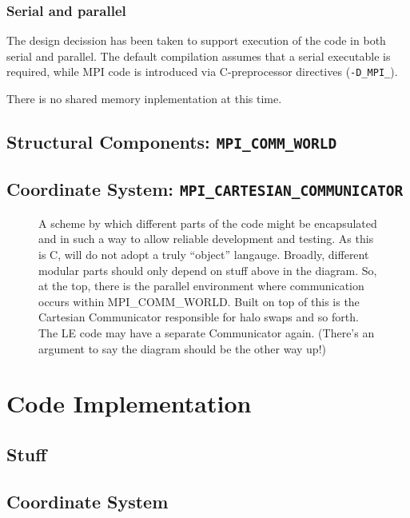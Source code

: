 \subsubsection{Serial and parallel}

The design decission has been taken to support execution of the
code in both serial and parallel. The default compilation
assumes that a serial executable is required, while  MPI code
is introduced via C-preprocessor directives (\texttt{-D\_MPI\_}).


There is no shared memory inplementation at this time.


\subsection{Structural Components: \texttt{MPI\_COMM\_WORLD}}


\subsection{Coordinate System: \texttt{MPI\_CARTESIAN\_COMMUNICATOR}}


\begin{figure}
\begin{center}
\end{center}
\caption{A scheme by which different parts of the code might be
encapsulated and in such a way to allow reliable development and
testing. As this is C, will do not adopt a truly ``object'' langauge.
Broadly, different modular parts should only depend on stuff above
in the diagram. So, at the top, there is the parallel environment
where communication occurs within MPI\_COMM\_WORLD. Built on top
of this is the Cartesian Communicator responsible for halo swaps
and so forth. The LE code may have a separate Communicator again. 
(There's an argument to say the diagram should be the other way up!)}
\end{figure}



\section{Code Implementation}

\subsection{Stuff}

\subsection{Coordinate System}

